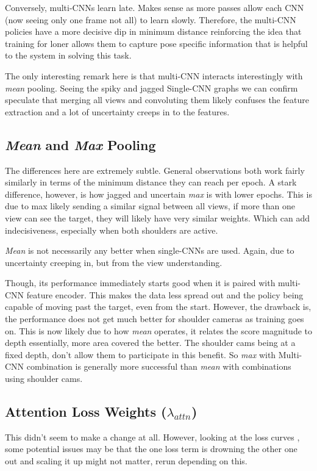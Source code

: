 Conversely, multi-CNNs learn late. Makes sense as more passes allow each CNN (now seeing only one frame not all) to learn slowly. Therefore, the multi-CNN policies have a more decisive dip in minimum distance reinforcing the idea that training for loner allows them to capture pose specific information that is helpful to the system in solving this task.

The only interesting remark here is that multi-CNN interacts interestingly with \emph{mean} pooling. Seeing the spiky and jagged Single-CNN graphs we can confirm speculate that merging all views and convoluting them likely confuses the feature extraction and a lot of uncertainty creeps in to the features.


\subsection{\emph{Mean} and \emph{Max} Pooling}
The differences here are extremely subtle. General observations both work fairly similarly in terms of the minimum distance they can reach per epoch. A stark difference, however, is how jagged and uncertain \emph{max} is with lower epochs. This is due to max likely sending a similar signal between all views, if more than one view can see the target, they will likely have very similar weights. Which can add indecisiveness, especially when both shoulders are active.

\emph{Mean} is not necessarily any better when single-CNNs are used. Again, due to uncertainty creeping in, but from the view understanding.

Though, its performance immediately starts good when it is paired with multi-CNN feature encoder. This makes the data less spread out  and the policy being capable of moving past the target, even from the start. However, the drawback is, the performance does not get much better for shoulder cameras as training goes on. This is now likely due to how \emph{mean} operates, it relates the score magnitude to depth essentially, more area covered the better. The shoulder cams being at a fixed depth, don't allow them to participate in this benefit. So \emph{max} with Multi-CNN combination is generally more successful than \emph{mean} with combinations using shoulder cams.

\subsection{Attention Loss Weights ($\lambda_{attn}$)}
This didn't seem to make a change at all. However, looking at the loss curves , some potential issues may be that the one loss term is drowning the other one out and scaling it up might not matter, rerun depending on this.


